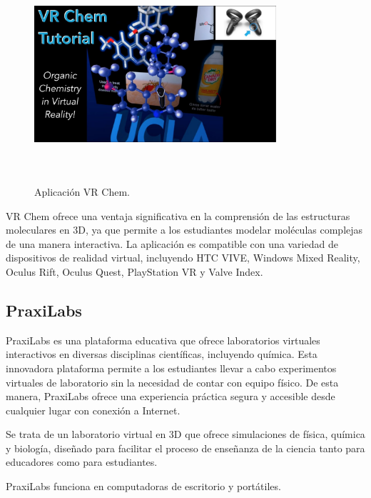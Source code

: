 \begin{figure}[thbp]
    \centering
    \includegraphics[width=0.8\textwidth, height=8cm]{img/chapter01/Garg_Lab_VR_Chem.jpg}
    \caption{Aplicación VR Chem.}\label{fig:Esquema}
\end{figure}

VR Chem ofrece una ventaja significativa en la comprensión de las estructuras moleculares en 3D, ya que permite a los estudiantes modelar moléculas complejas de una manera interactiva. La aplicación es compatible con una variedad de dispositivos de realidad virtual, incluyendo HTC VIVE, Windows Mixed Reality, Oculus Rift, Oculus Quest, PlayStation VR y Valve Index.

\newpage
\subsection{PraxiLabs}

PraxiLabs es una plataforma educativa que ofrece laboratorios virtuales interactivos en diversas disciplinas científicas, incluyendo química. Esta innovadora plataforma permite a los estudiantes llevar a cabo experimentos virtuales de laboratorio sin la necesidad de contar con equipo físico. De esta manera, PraxiLabs ofrece una experiencia práctica segura y accesible desde cualquier lugar con conexión a Internet.

Se trata de un laboratorio virtual en 3D que ofrece simulaciones de física, química y biología, diseñado para facilitar el proceso de enseñanza de la ciencia tanto para educadores como para estudiantes.

PraxiLabs funciona en computadoras de escritorio y portátiles.


